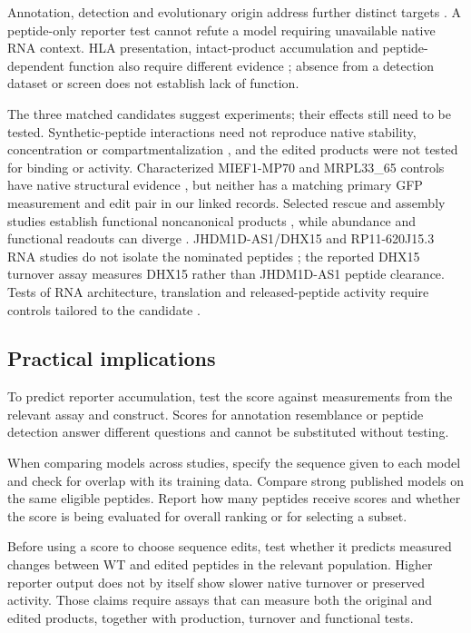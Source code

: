 \documentclass[11pt,a4paper]{article}
\begin{document}
Annotation, detection and evolutionary origin address further distinct
targets \cite{shortstop,trans2ms,fierro,middendorf,roginski,cardiacevolution,vakirlis}.
A peptide-only reporter test cannot refute a model requiring unavailable
native RNA context. HLA presentation, intact-product accumulation and
peptide-dependent function also require different evidence
\cite{wacholder,deutsch}; absence from a detection dataset or screen does not establish lack of function.

The three matched candidates suggest experiments; their effects still need to be tested.
Synthetic-peptide interactions need not reproduce native stability,
concentration or compartmentalization \cite{sandmann}, and the edited
products were not tested for binding or activity. Characterized MIEF1-MP70
and MRPL33\_65 controls have native structural evidence
\cite{brownmitoribosome}, but neither has a matching primary GFP measurement and edit pair in our linked records. Selected rescue and assembly studies establish functional
noncanonical products \cite{chenfunctional,prensner,hofman,samandi,rathoremief},
while abundance and functional readouts can diverge \cite{salghetti,matreyek}.
JHDM1D-AS1/DHX15 and RP11-620J15.3 RNA studies do not isolate the nominated
peptides \cite{yao,malmstrom,liu}; the reported DHX15 turnover assay measures
DHX15 rather than JHDM1D-AS1 peptide clearance. Tests of RNA architecture, translation and released-peptide activity require controls tailored to the candidate
\cite{yang,shepelev,devaux}.

\subsection{Practical implications}
To predict reporter accumulation, test the score against measurements from the relevant assay and construct. Scores for annotation resemblance or peptide detection answer different questions and cannot be substituted without testing.

When comparing models across studies, specify the sequence given to each model and check for overlap with its training data. Compare strong published models on the same eligible peptides. Report how many peptides receive scores and whether the score is being evaluated for overall ranking or for selecting a subset.

Before using a score to choose sequence edits, test whether it predicts measured changes between WT and edited peptides in the relevant population. Higher reporter output does not by itself show slower native turnover or preserved activity. Those claims require assays that can measure both the original and edited products, together with production, turnover and functional tests.
\end{document}
